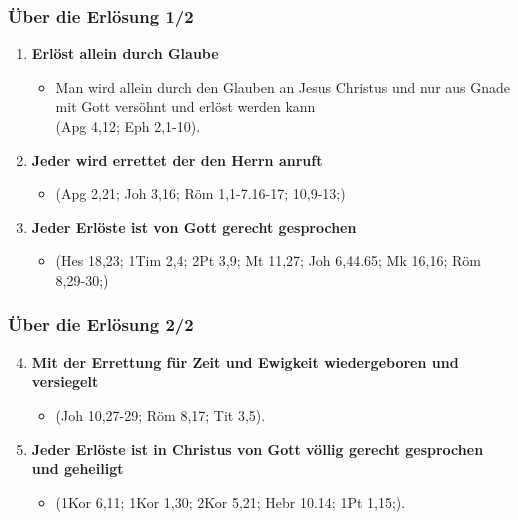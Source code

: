 \documentclass[aspectratio=43]{beamer}
\begin{document}
\begin{frame}
    \frametitle{Über die Erlösung 1/2}  %
    \vspace{0.80cm}    
    \begin{enumerate}
        \item \textbf{Erlöst allein durch Glaube}
            \begin{itemize}              
                \item Man wird allein durch den Glauben an Jesus Christus und nur aus Gnade mit Gott versöhnt und erlöst werden kann \\
                (Apg 4,12; Eph 2,1-10).               
            \end{itemize}            
            \vspace{0.2cm}            
        \item \textbf{Jeder wird errettet der den Herrn anruft}
            \begin{itemize}
                \item (Apg 2,21; Joh 3,16; Röm 1,1-7.16-17; 10,9-13;)
            \end{itemize}            
            \vspace{0.2cm}           
        \item \textbf{Jeder Erlöste ist von Gott gerecht gesprochen}
            \begin{itemize}
                \item  (Hes 18,23; 1Tim 2,4; 2Pt 3,9; Mt 11,27; Joh 6,44.65; Mk 16,16; Röm 8,29-30;)
            \end{itemize} 
            \vspace{0.2cm}
            \end{enumerate}   
    \end{frame}
    \begin{frame}
        \frametitle{Über die Erlösung 2/2}  %
        \vspace{0.80cm}    
        \begin{enumerate}
            \setcounter{enumi}{3}
            \item \textbf{Mit der Errettung für Zeit und Ewigkeit wiedergeboren und versiegelt} 
                \begin{itemize}
                    \item (Joh 10,27-29; Röm 8,17; Tit 3,5).                
                \end{itemize} 
                \vspace{0.2cm}                
            \item \textbf{Jeder Erlöste ist in Christus von Gott völlig gerecht gesprochen und geheiligt}
                \begin{itemize}
                    \item (1Kor 6,11; 1Kor 1,30; 2Kor 5,21; Hebr 10.14; 1Pt 1,15;).                
                \end{itemize} 
        \end{enumerate}   
    \end{frame} 
\end{document}
